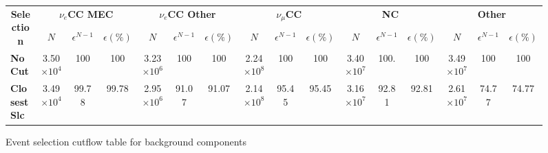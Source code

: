 \begin{sidewaysfigure}[!hb]
\caption{Event selection cutflow table for background components}
\begin{scriptsize}
\begin{tabular}{|l|ccc|ccc|ccc|ccc|ccc|}\hline
\multicolumn{1}{|c|}{\multirow{2}{*}{\textbf{Selection}}} & \multicolumn{3}{c|}{\textbf{$\nu_e$CC MEC}} &
\multicolumn{3}{c|}{\textbf{$\nu_e$CC Other}} &
\multicolumn{3}{c|}{\textbf{$\nu_\mu$CC}} &
\multicolumn{3}{c|}{\textbf{NC}} &
\multicolumn{3}{c|}{\textbf{Other}} \\
\multicolumn{1}{|c|}{}                                    & \multicolumn{1}{c}{\textbf{$N$}} & \textbf{$\epsilon^{N-1}$} & \textbf{$\epsilon \left(\%\right)$} & \multicolumn{1}{c}{\textbf{$N$}} & \textbf{$\epsilon^{N-1}$} & \textbf{$\epsilon \left(\%\right)$} & \multicolumn{1}{c}{\textbf{$N$}} & \textbf{$\epsilon^{N-1}$} & \textbf{$\epsilon \left(\%\right)$} & \multicolumn{1}{c}{\textbf{$N$}} & \textbf{$\epsilon^{N-1}$} & \textbf{$\epsilon \left(\%\right)$} & \multicolumn{1}{c}{\textbf{$N$}} & \textbf{$\epsilon^{N-1}$} & \textbf{$\epsilon \left(\%\right)$} \\\hline
\textbf{No Cut}      & 3.50$\times 10^4$           & 100 & 100                                     & 3.23$\times 10^6$             & 100 & 100 & 2.24$\times 10^8$              & 100                                                                 & 100                                        & 3.40$\times 10^7$          & 100.                                                             & 100                                    & 3.49$\times 10^7$                      & 100 & 100                                       \\
\textbf{Closest Slc} & 3.49$\times 10^4$          & 99.78                                                               & 99.78                                      & 2.95$\times 10^6$             & 91.07                                                                 & 91.07                                        & 2.14$\times 10^8$ & 95.45                                                                  & 95.45                                         & 3.16$\times 10^7$                   & 92.81                                                              & 92.81                                     & 2.61$\times 10^7$                      & 74.77                                                                 & 74.77                                        \\

\end{tabular}
\end{scriptsize}
\end{sidewaysfigure}
